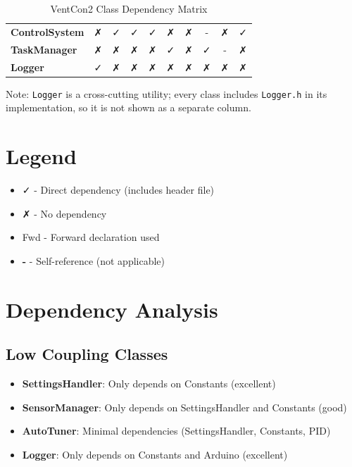 \documentclass[12pt,a4paper]{article}
\begin{document}
\begin{table}[h!]
\begin{tabular}{@{}l|c|c|c|c|c|c|c|c|c@{}}
\textbf{ControlSystem} & \cellcolor{gray!20}✗ & \cellcolor{green!30}✓ & \cellcolor{green!30}✓ & \cellcolor{green!30}✓ & \cellcolor{gray!20}✗ & \cellcolor{gray!20}✗ & - & \cellcolor{gray!20}✗ & \cellcolor{green!30}✓ \\
\textbf{TaskManager} & \cellcolor{gray!20}✗ & \cellcolor{gray!20}✗ & \cellcolor{gray!20}✗ & \cellcolor{gray!20}✗ & \cellcolor{green!30}✓ & \cellcolor{gray!20}✗ & \cellcolor{green!30}✓ & - & \cellcolor{gray!20}✗ \\
\textbf{Logger} & \cellcolor{green!30}✓ & \cellcolor{gray!20}✗ & \cellcolor{gray!20}✗ & \cellcolor{gray!20}✗ & \cellcolor{gray!20}✗ & \cellcolor{gray!20}✗ & \cellcolor{gray!20}✗ & \cellcolor{gray!20}✗ & \cellcolor{gray!20}✗ \\
\bottomrule
\end{tabular}
\caption{VentCon2 Class Dependency Matrix}
\end{table}

Note: \texttt{Logger} is a cross-cutting utility; every class includes \texttt{Logger.h} in its implementation, so it is not shown as a separate column.

\section{Legend}
\begin{itemize}
    \item \colorbox{green!30}{✓} - Direct dependency (includes header file)
    \item \colorbox{gray!20}{✗} - No dependency
    \item \colorbox{yellow!30}{Fwd} - Forward declaration used
    \item \textbf{-} - Self-reference (not applicable)
\end{itemize}

\section{Dependency Analysis}

\subsection{Low Coupling Classes}
\begin{itemize}
    \item \textbf{SettingsHandler}: Only depends on Constants (excellent)
    \item \textbf{SensorManager}: Only depends on SettingsHandler and Constants (good)
    \item \textbf{AutoTuner}: Minimal dependencies (SettingsHandler, Constants, PID)
    \item \textbf{Logger}: Only depends on Constants and Arduino (excellent)
\end{itemize}
\end{document}

